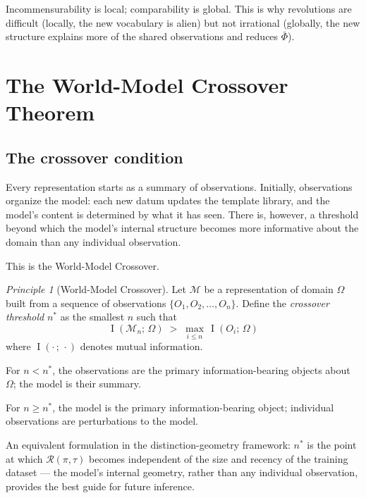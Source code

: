 \documentclass[11pt, a4paper]{article}
\theoremstyle{plain}
\theoremstyle{definition}
\theoremstyle{remark}
\newtheorem{principle}[theorem]{Principle}
\newcommand{\Reach}{\mathcal{R}}
\newcommand{\Proj}{\pi}
\newcommand{\PhiF}{\varPhi}
\newcommand{\Mod}{\mathcal{M}}
\newcommand{\nstar}{n^{*}}
\DeclareMathOperator{\Info}{I}
\begin{document}
Incommensurability is local; comparability is global.
This is why revolutions are difficult (locally, the new vocabulary
is alien) but not irrational (globally, the new structure explains
more of the shared observations and reduces $\bar\PhiF$).

\section{The World-Model Crossover Theorem}
\label{sec:crossover}

\subsection{The crossover condition}

Every representation starts as a summary of observations.
Initially, observations organize the model: each new datum updates
the template library, and the model's content is determined by
what it has seen. There is, however, a threshold beyond which
the model's internal structure becomes more informative about
the domain than any individual observation.

This is the World-Model Crossover.

\begin{principle}[World-Model Crossover]
\label{prin:crossover}
Let $\Mod$ be a representation of domain $\Omega$ built from a
sequence of observations $\{O_1, O_2, \ldots, O_n\}$.
Define the \emph{crossover threshold} $\nstar$ as the smallest
$n$ such that
\[
  \Info(\Mod_n;\, \Omega) \;>\; \max_{i \leq n}\, \Info(O_i;\, \Omega)
\]
where $\Info(\cdot\,;\,\cdot)$ denotes mutual information.

For $n < \nstar$, the observations are the primary information-bearing
objects about $\Omega$; the model is their summary.

For $n \geq \nstar$, the model is the primary information-bearing
object; individual observations are perturbations to the model.

An equivalent formulation in the distinction-geometry framework:
$\nstar$ is the point at which $\Reach(\Proj, \tau)$ becomes
independent of the size and recency of the training dataset ---
the model's internal geometry, rather than any individual observation,
provides the best guide for future inference.
\end{principle}
\end{document}
